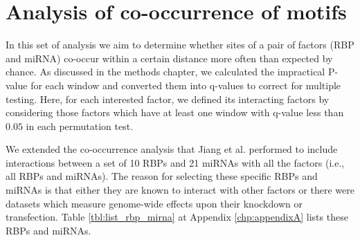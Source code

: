 \section{Analysis of co-occurrence of motifs}

In this set of analysis we aim to determine whether sites of a pair of factors (RBP and miRNA) co-occur within a certain distance more often than expected by chance. As discussed in the methods chapter, we calculated the impractical P-value for each window and converted them into q-values to correct for multiple testing. Here, for each interested factor, we defined its interacting factors by considering those factors which have at least one window with q-value less than $0.05$ in each permutation test.

We extended the co-occurrence analysis that Jiang et al. performed to include interactions between a set of 10 RBPs and 21 miRNAs with all the factors (i.e., all RBPs and miRNAs). The reason for selecting these specific RBPs and miRNAs is that either they are known to interact with other factors or there were datasets which measure genome-wide effects upon their knockdown or transfection. Table \ref{tbl:list_rbp_mirna} at Appendix \ref{chp:appendixA} lists these RBPs and miRNAs.%

